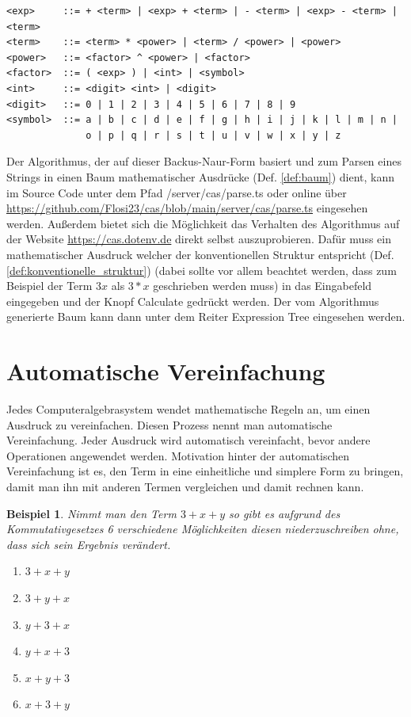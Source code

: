 \documentclass[11pt]{article}
\newcommand{\lab}[1]{(Def. \ref{#1})}
\newtheorem{example}{Beispiel}
\begin{document}
\begin{verbatim}
<exp>     ::= + <term> | <exp> + <term> | - <term> | <exp> - <term> | <term> 
<term>    ::= <term> * <power> | <term> / <power> | <power>
<power>   ::= <factor> ^ <power> | <factor>
<factor>  ::= ( <exp> ) | <int> | <symbol> 
<int>     ::= <digit> <int> | <digit>
<digit>   ::= 0 | 1 | 2 | 3 | 4 | 5 | 6 | 7 | 8 | 9 
<symbol>  ::= a | b | c | d | e | f | g | h | i | j | k | l | m | n | 
              o | p | q | r | s | t | u | v | w | x | y | z
\end{verbatim}

Der Algorithmus, der auf dieser Backus-Naur-Form basiert und zum Parsen eines Strings in einen
Baum mathematischer Ausdrücke \lab{def:baum} dient, kann im Source Code unter dem Pfad /server/cas/parse.ts 
oder online über \url{https://github.com/Flosi23/cas/blob/main/server/cas/parse.ts} eingesehen werden. \newline
Außerdem bietet sich die Möglichkeit das Verhalten des Algorithmus auf der Website  \url{https://cas.dotenv.de}
direkt selbst auszuprobieren. Dafür muss ein mathematischer Ausdruck welcher der konventionellen Struktur 
entspricht \lab{def:konventionelle_struktur}
(dabei sollte vor allem beachtet werden, dass zum Beispiel der Term $3x$ als $3*x$ geschrieben werden muss)
in das Eingabefeld eingegeben und der Knopf \glqq Calculate\grqq{}  gedrückt werden. 
Der vom Algorithmus generierte Baum kann dann unter dem Reiter \glqq Expression Tree\grqq{} eingesehen werden.

\section{Automatische Vereinfachung}

Jedes Computeralgebrasystem wendet mathematische Regeln an, um einen Ausdruck zu vereinfachen. 
Diesen Prozess nennt man automatische Vereinfachung. 
Jeder Ausdruck wird automatisch vereinfacht, bevor andere Operationen angewendet werden. 
Motivation hinter der automatischen Vereinfachung ist es, den Term in eine einheitliche und simplere Form zu bringen, 
damit man ihn mit anderen Termen vergleichen und damit rechnen kann. 

\begin{example} \normalfont
Nimmt man den Term $3+x+y$ so gibt es aufgrund des Kommutativgesetzes 6 verschiedene Möglichkeiten diesen
niederzuschreiben ohne, dass sich sein Ergebnis verändert.
\begin{enumerate}
  \item $3+x+y$
  \item $3+y+x$
  \item $y+3+x$
  \item $y+x+3$
  \item $x+y+3$
  \item $x+3+y$
\end{enumerate}
\end{example}
\end{document}
